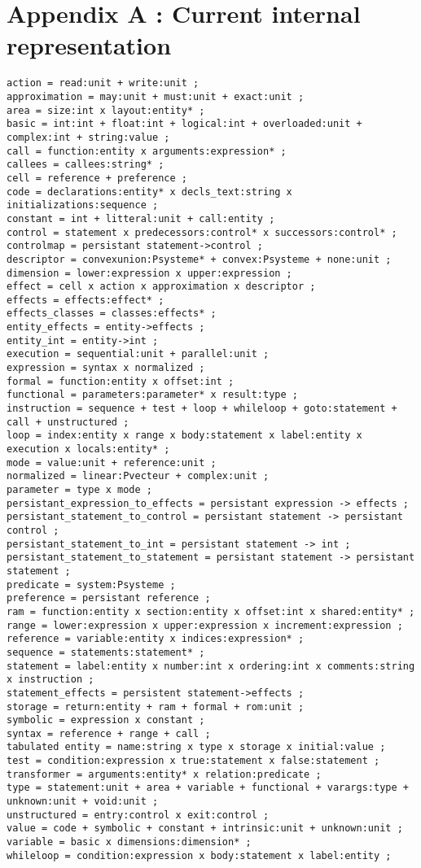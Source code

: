 \documentclass[a4paper]{article}
\begin{document}
\section{Appendix A : Current internal representation}
\begin{verbatim}
action = read:unit + write:unit ;
approximation = may:unit + must:unit + exact:unit ;
area = size:int x layout:entity* ;
basic = int:int + float:int + logical:int + overloaded:unit + complex:int + string:value ;
call = function:entity x arguments:expression* ;
callees = callees:string* ;
cell = reference + preference ;
code = declarations:entity* x decls_text:string x initializations:sequence ;
constant = int + litteral:unit + call:entity ;
control = statement x predecessors:control* x successors:control* ;
controlmap = persistant statement->control ;
descriptor = convexunion:Psysteme* + convex:Psysteme + none:unit ;
dimension = lower:expression x upper:expression ;
effect = cell x action x approximation x descriptor ;
effects = effects:effect* ;
effects_classes = classes:effects* ;
entity_effects = entity->effects ;
entity_int = entity->int ;
execution = sequential:unit + parallel:unit ;
expression = syntax x normalized ;
formal = function:entity x offset:int ;
functional = parameters:parameter* x result:type ;
instruction = sequence + test + loop + whileloop + goto:statement + call + unstructured ;
loop = index:entity x range x body:statement x label:entity x execution x locals:entity* ;
mode = value:unit + reference:unit ;
normalized = linear:Pvecteur + complex:unit ;
parameter = type x mode ;
persistant_expression_to_effects = persistant expression -> effects ;
persistant_statement_to_control = persistant statement -> persistant control ;
persistant_statement_to_int = persistant statement -> int ;
persistant_statement_to_statement = persistant statement -> persistant statement ;
predicate = system:Psysteme ;
preference = persistant reference ;
ram = function:entity x section:entity x offset:int x shared:entity* ;
range = lower:expression x upper:expression x increment:expression ;
reference = variable:entity x indices:expression* ;
sequence = statements:statement* ;
statement = label:entity x number:int x ordering:int x comments:string x instruction ;
statement_effects = persistent statement->effects ;
storage = return:entity + ram + formal + rom:unit ;
symbolic = expression x constant ;
syntax = reference + range + call ;
tabulated entity = name:string x type x storage x initial:value ;
test = condition:expression x true:statement x false:statement ;
transformer = arguments:entity* x relation:predicate ;
type = statement:unit + area + variable + functional + varargs:type + unknown:unit + void:unit ;
unstructured = entry:control x exit:control ;
value = code + symbolic + constant + intrinsic:unit + unknown:unit ;
variable = basic x dimensions:dimension* ;
whileloop = condition:expression x body:statement x label:entity ;
\end{verbatim}
\newpage
\end{document}
